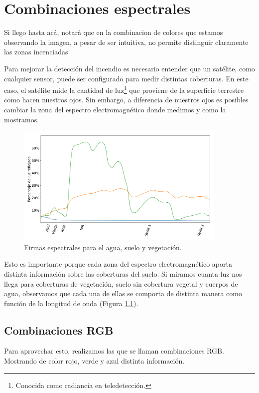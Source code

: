 \documentclass[a4paper,12pt]{book}
\begin{document}
\chapter{Combinaciones espectrales}
Si llego hasta acá, notará que en la combinacion de colores que estamos observando la imagen, a pesar de ser intuitiva, no permite distinguir claramente las zonas incenciadas

Para mejorar la detección del incendio es necesario entender que un satélite, como cualquier sensor, puede ser configurado para medir distintas coberturas. En este caso, el satélite mide la cantidad de luz\footnote{Conocida como radiancia en teledetección.} que proviene de la superficie terrestre como hacen nuestros ojos. Sin embargo, a diferencia de nuestros ojos es posibles cambiar la zona del espectro electromagnético donde medimos y como la mostramos.

\begin{figure}[h!]
    \centering
    \includegraphics[width=0.9\textwidth]{fig:spec.png}
    \caption{Firmas espectrales para el agua, suelo y vegetación.}
    \label{fig:spec}
\end{figure}

Esto es importante porque cada zona del espectro electromagnético aporta distinta información sobre las coberturas del suelo. Si miramos cuanta luz nos llega para coberturas de vegetación, suelo sin cobertura vegetal y cuerpos de agua, observamos que cada una de ellas se comporta de distinta manera como función de la longitud de onda (Figura \ref{fig:spec}).

\section{Combinaciones RGB}

Para aprovechar esto, realizamos las que se llaman combinaciones RGB. Mostrando de color rojo, verde y azul distinta información.
\end{document}
